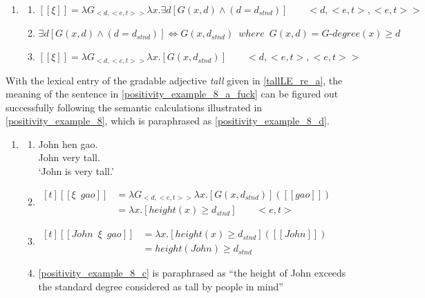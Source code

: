 \documentclass{ctexart}
\begin{document}
\begin{enumerate}
    \item \label{positivity_example_7}
    \begin{enumerate}
        \item \label{positivity_example_7_a}
        $[\![\xi]\!]=\lambda G_{<d,<e,t>>} \lambda x. \exists d [G(x,d) \land (d=d_{stnd})] \qquad <d,<e,t>,<e,t>>$

        \item \label{positivity_example_7_b}
        $\exists d [G(x,d) \land (d=d_{stnd})] \Leftrightarrow G(x,d_{stnd}) \enspace where \enspace G(x,d) = G \mbox{-} degree(x) \geq d$

        \item \label{positivity_example_8_a}
        $[\![\xi]\!]=\lambda G_{<d,<e,t>>} \lambda x. [G(x,d_{stnd})] \qquad <d,<e,t>,<e,t>>$

    \end{enumerate}
\end{enumerate}

With the lexical entry of the gradable adjective \textit{tall} given in \ref{tallLE_re_a}, the meaning of the sentence in \ref{positivity_example_8_a_fuck} can be figured out successfully following the semantic calculations illustrated in \ref{positivity_example_8}, which is paraphrased as \ref{positivity_example_8_d}.

\begin{enumerate}
    \item \label{positivity_example_8}
    \begin{enumerate}

        \item \label{positivity_example_8_a_fuck}
        John hen gao. \\
        John very tall. \\
        `John is very tall.'

        \item \label{positivity_example_8_b}
        $\begin{aligned}[t]
            [\![\xi \enspace gao]\!] &= \lambda G_{<d,<e,t>>} \lambda x. [G(x,d_{stnd})]([\![gao]\!]) \\
            &= \lambda x.[height(x) \geq d_{stnd}] \qquad <e,t>
        \end{aligned}$

        \item \label{positivity_example_8_c}
        $\begin{aligned}[t]
            [\![John \enspace \xi \enspace gao]\!] &= \lambda x.[height(x) \geq d_{stnd}]([\![John]\!]) \\
            &= height(John) \geq d_{stnd}
        \end{aligned}$

        \item \label{positivity_example_8_d}
        \ref{positivity_example_8_c} is paraphrased as ``the height of John exceeds the standard degree considered as tall by people in mind''

    \end{enumerate}
\end{enumerate}
\end{document}
